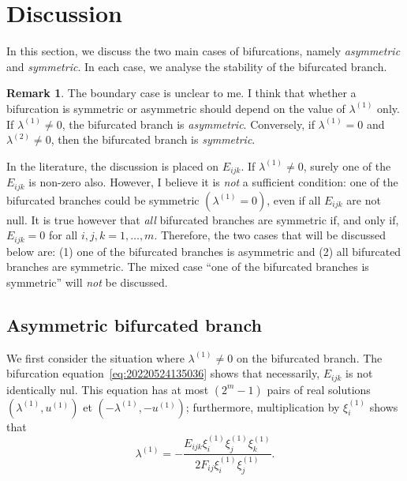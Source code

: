 \documentclass[12pt, final]{scrartcl}
\theoremstyle{definition}
\newtheorem{remark}{Remark}
\newcommand{\order}[2][1]{#2^{(#1)}}
\begin{document}
\section{Discussion}

In this section, we discuss the two main cases of bifurcations, namely
\emph{asymmetric} and \emph{symmetric}. In each case, we analyse the stability
of the bifurcated branch.

\begin{remark}
  The boundary case is unclear to me. I think that whether a bifurcation is
  symmetric or asymmetric should depend on the value of $\order[1]\lambda$ only. If
  $\order[1]\lambda ≠ 0$, the bifurcated branch is \emph{asymmetric}. Conversely, if
  $\order[1]\lambda = 0$ and $\order[2]\lambda ≠ 0$, then the bifurcated branch is \emph{symmetric}.

  In the literature, the discussion is placed on $E_{ijk}$. If $\order[1]\lambda ≠ 0$,
  surely one of the $E_{ijk}$ is non-zero also. However, I believe it is
  \emph{not} a sufficient condition: one of the bifurcated branches could be
  symmetric $(\order[1]\lambda = 0)$, even if all $E_{ijk}$ are not null. It is true
  however that \emph{all} bifurcated branches are symmetric if, and only if,
  $E_{ijk}=0$ for all $i, j, k = 1, \ldots, m$. Therefore, the two cases
  that will be discussed below are: (1) one of the bifurcated branches is
  asymmetric and (2) all bifurcated branches are symmetric. The mixed case ``one
  of the bifurcated branches is symmetric'' will \emph{not} be discussed.
\end{remark}

\subsection{Asymmetric bifurcated branch}

We first consider the situation where $\order[1]\lambda ≠ 0$ on the bifurcated
branch. The bifurcation equation~\eqref{eq:20220524135036} shows that
necessarily, $E_{ijk}$ is not identically nul. This equation has at most
$(2^m - 1)$ pairs of real solutions $(\order[1]\lambda, \order[1]u)$ et
$(- \order[1]\lambda, - \order[1]u)$; furthermore, multiplication by
$\order[1]{\xi_i}$ shows that
\begin{equation}
  \label{eq:20220801085236}
  \order[1]\lambda = -\frac{E_{ijk} \order[1]{\xi_i} \order[1]{\xi_j} \order[1]{\xi_k}}{2 F_{ij} \order[1]{\xi_i} \order[1]{\xi_j}}.
\end{equation}
\end{document}

